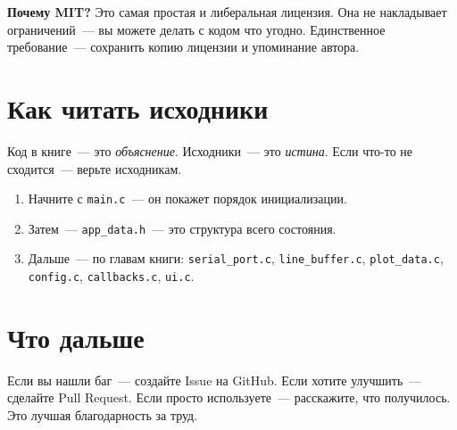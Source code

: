 \begin{ideabox}
\textbf{Почему MIT?} Это самая простая и либеральная лицензия.
Она не накладывает ограничений~--- вы можете делать с кодом
что угодно. Единственное требование~--- сохранить копию лицензии
и упоминание автора.
\end{ideabox}

\section{Как читать исходники}

Код в книге~--- это \emph{объяснение}. Исходники~--- это
\emph{истина}. Если что-то не сходится~--- верьте исходникам.

\begin{enumerate}
    \item Начните с \texttt{main.c}~--- он покажет порядок
          инициализации.
    \item Затем~--- \texttt{app\_data.h}~--- это структура
          всего состояния.
    \item Дальше~--- по главам книги: \texttt{serial\_port.c},
          \texttt{line\_buffer.c}, \texttt{plot\_data.c},
          \texttt{config.c}, \texttt{callbacks.c}, \texttt{ui.c}.
\end{enumerate}

\section{Что дальше}

Если вы нашли баг~--- создайте Issue на GitHub.
Если хотите улучшить~--- сделайте Pull Request.
Если просто используете~--- расскажите, что получилось.
Это лучшая благодарность за труд.

